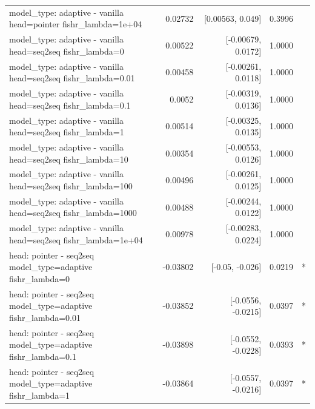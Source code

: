 \documentclass[10pt]{article}
\makeatletter
\newcommand{\stackcell}[1]{\begin{tabular}[t]{@{}l@{}}#1\end{tabular}}
\makeatother
\begin{document}
{\begin{longtable}{lrrrl}
\stackcell{model\_type: adaptive - vanilla\\\footnotesize head=pointer fishr\_lambda=1e+04 } & 0.02732 & [0.00563, 0.049] & 0.3996 & \\
\stackcell{model\_type: adaptive - vanilla\\\footnotesize head=seq2seq fishr\_lambda=0 } & 0.00522 & [-0.00679, 0.0172] & 1.0000 & \\
\stackcell{model\_type: adaptive - vanilla\\\footnotesize head=seq2seq fishr\_lambda=0.01 } & 0.00458 & [-0.00261, 0.0118] & 1.0000 & \\
\stackcell{model\_type: adaptive - vanilla\\\footnotesize head=seq2seq fishr\_lambda=0.1 } & 0.0052 & [-0.00319, 0.0136] & 1.0000 & \\
\stackcell{model\_type: adaptive - vanilla\\\footnotesize head=seq2seq fishr\_lambda=1 } & 0.00514 & [-0.00325, 0.0135] & 1.0000 & \\
\stackcell{model\_type: adaptive - vanilla\\\footnotesize head=seq2seq fishr\_lambda=10 } & 0.00354 & [-0.00553, 0.0126] & 1.0000 & \\
\stackcell{model\_type: adaptive - vanilla\\\footnotesize head=seq2seq fishr\_lambda=100 } & 0.00496 & [-0.00261, 0.0125] & 1.0000 & \\
\stackcell{model\_type: adaptive - vanilla\\\footnotesize head=seq2seq fishr\_lambda=1000 } & 0.00488 & [-0.00244, 0.0122] & 1.0000 & \\
\stackcell{model\_type: adaptive - vanilla\\\footnotesize head=seq2seq fishr\_lambda=1e+04 } & 0.00978 & [-0.00283, 0.0224] & 1.0000 & \\
\stackcell{head: pointer - seq2seq\\\footnotesize model\_type=adaptive fishr\_lambda=0 } & -0.03802 & [-0.05, -0.026] & 0.0219 & *\\
\stackcell{head: pointer - seq2seq\\\footnotesize model\_type=adaptive fishr\_lambda=0.01 } & -0.03852 & [-0.0556, -0.0215] & 0.0397 & *\\
\stackcell{head: pointer - seq2seq\\\footnotesize model\_type=adaptive fishr\_lambda=0.1 } & -0.03898 & [-0.0552, -0.0228] & 0.0393 & *\\
\stackcell{head: pointer - seq2seq\\\footnotesize model\_type=adaptive fishr\_lambda=1 } & -0.03864 & [-0.0557, -0.0216] & 0.0397 & *\\

\end{longtable}}
\end{document}
